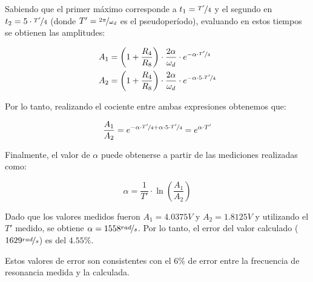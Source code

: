 \documentclass[tc_tp3_anexo_main.tex]{subfiles}
\begin{document}
Sabiendo que el primer m\'aximo corresponde a $t_1 = \nicefrac{T'}{4}$ y el segundo en $t_2 =5\cdot \nicefrac{T'}{4}$ (donde $T' = \nicefrac{2\pi}{\omega_d}$ es el pseudoper\'iodo), evaluando en estos tiempos se obtienen las amplitudes:\par 

\begin{equation}
	\begin{aligned}
		A_1 &=  \left(1+\frac{R_4}{R_8} \right) \cdot \frac{2\alpha}{\omega_d} \cdot e^{-\alpha \cdot \nicefrac{T'}{4}} \\
		A_2 &=  \left(1+\frac{R_4}{R_8} \right) \cdot \frac{2\alpha}{\omega_d} \cdot e^{-\alpha\cdot 5\cdot \nicefrac{T'}{4}} 
	\end{aligned}
\end{equation}

Por lo tanto, realizando el cociente entre ambas expresiones obtenemos que:

\[ \frac{A_1}{A_2}  = e^{-\alpha \cdot \nicefrac{T'}{4} + \alpha\cdot 5\cdot \nicefrac{T'}{4}}  = e^{\alpha \cdot T'} \]

Finalmente, el valor de $\alpha$ puede obtenerse a partir de las mediciones realizadas como:

\begin{equation}
	\alpha = \frac{1}{T'} \cdot \ln{\left(\frac{A_1}{A_2}\right)}
\end{equation}

Dado que los valores medidos fueron $A_1 = 4.0375V$ y $A_2 = 1.8125V$ y utilizando el $T'$ medido, se obtiene \textbf{$\alpha = 1558\nicefrac{rad}{s}$}. Por lo tanto, el error del valor calculado ($1629\nicefrac{rad}{s}$) es del $4.55\%$.\par

Estos valores de error son consistentes con el $6\%$ de error entre la frecuencia de resonancia medida y la calculada.
\end{document}
